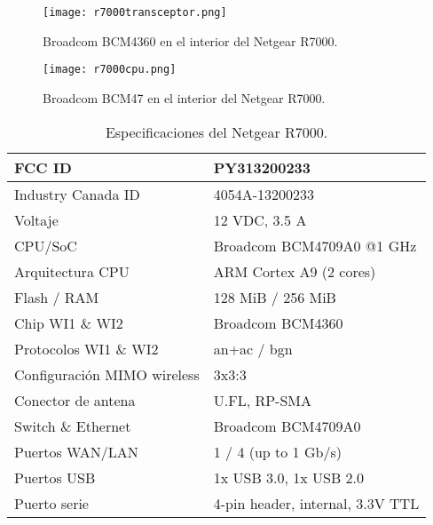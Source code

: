\begin{figure}[H]
    \centering
    \texttt{[image: r7000transceptor.png]}
    \caption{Broadcom BCM4360 en el interior del Netgear R7000.\cite{netgearFCCid}}
    \label{fig:r7000transceptor}
\end{figure}

\begin{figure}[H]
    \centering
    \texttt{[image: r7000cpu.png]}
    \caption{Broadcom BCM47 en el interior del Netgear R7000.\cite{netgearFCCid}}
    \label{fig:r7000cpu}
\end{figure}

\begin{table}[H]
    \centering
    \begin{tabular}{ |l|m{20em}| }
    \hline
    FCC ID                      & PY313200233                      \\\hline
    Industry Canada ID          & 4054A-13200233                   \\\hline
    Voltaje                     & 12 VDC, 3.5 A                    \\\hline
    CPU/SoC                     & Broadcom BCM4709A0 @1 GHz        \\\hline
    Arquitectura CPU            & ARM Cortex A9 (2 cores)          \\\hline
    Flash / RAM                 & 128 MiB / 256 MiB                \\\hline
    Chip WI1 \& WI2             & Broadcom BCM4360                 \\\hline
    Protocolos WI1 \& WI2       & an+ac / bgn                      \\\hline
    Configuración MIMO wireless & 3x3:3                            \\\hline
    Conector de antena          & U.FL, RP-SMA                     \\\hline
    Switch \& Ethernet          & Broadcom BCM4709A0               \\\hline
    Puertos WAN/LAN             & 1 / 4 (up to 1 Gb/s)             \\\hline
    Puertos USB                 & 1x USB 3.0, 1x USB 2.0           \\\hline
    Puerto serie                & 4-pin header, internal, 3.3V TTL \\\hline
    \end{tabular}
    \caption{Especificaciones del Netgear R7000.\cite{r7000datasheet}}
    \label{table:r7000}
\end{table}


